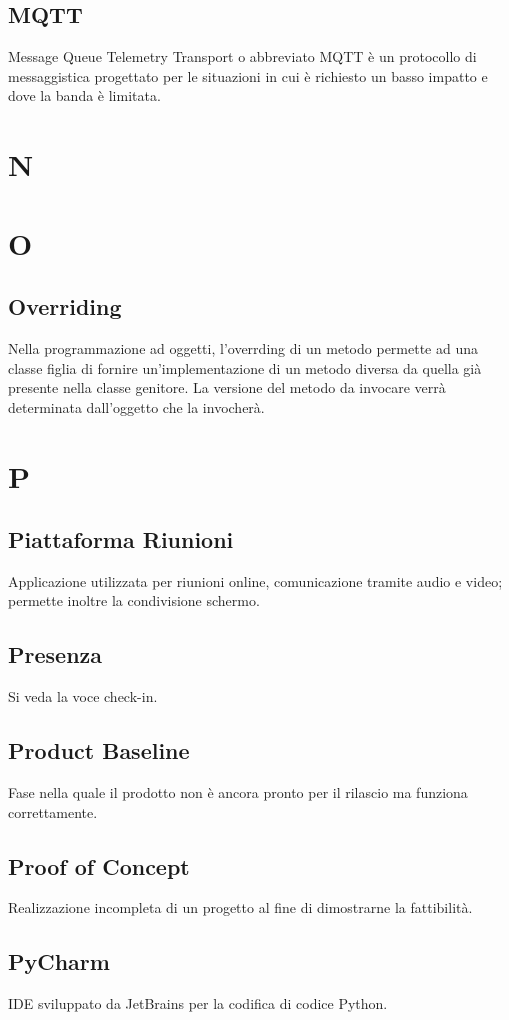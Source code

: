 \subsection{MQTT}
Message Queue Telemetry Transport o abbreviato MQTT è un protocollo di messaggistica progettato per le situazioni in cui è richiesto
un basso impatto e dove la banda è limitata.
\section{N}
\section{O}
\subsection{Overriding}
Nella programmazione ad oggetti, l'overrding di un metodo permette ad una classe figlia di fornire un'implementazione di un metodo diversa da quella già presente nella classe genitore.
La versione del metodo da invocare verrà determinata dall'oggetto che la invocherà.
\newpage
\section{P}
\subsection{Piattaforma Riunioni}
Applicazione utilizzata per riunioni online, comunicazione tramite audio e video; permette inoltre la condivisione schermo.
\subsection{Presenza}
Si veda la voce check-in. 
\subsection{Product Baseline}
Fase nella quale il prodotto non è ancora pronto per il rilascio ma funziona correttamente.
\subsection{Proof of Concept}
Realizzazione incompleta di un progetto al fine di dimostrarne la fattibilità.
\subsection{PyCharm}
IDE sviluppato da JetBrains per la codifica di codice Python.
